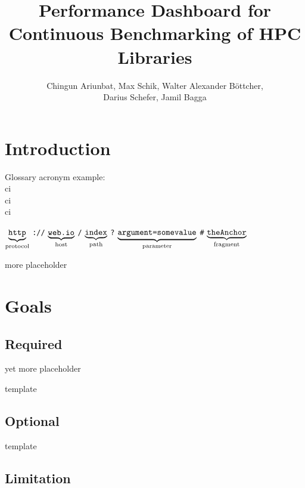 \documentclass[parskip=full,11pt]{scrartcl}
\title{Performance Dashboard for Continuous Benchmarking of HPC Libraries}
\author{Chingun Ariunbat, Max Schik, Walter Alexander B\"ottcher,\\ Darius Schefer, Jamil Bagga}
\newcommand\urlpart[2]{$\underbrace{\text{\texttt{#1}}}_{\text{#2}}$}
\begin{document}
\maketitle

\section{Introduction}
Glossary acronym example: \\
\acrshort{ci} \\
\acrlong{ci} \\
\acrfull{ci}

\begin{center}
\urlpart{http}{protocol}%
\texttt{://}%
\urlpart{web.io}{host}%
\texttt{/}%
\urlpart{index}{path}%
\texttt{?}%
\urlpart{argument=somevalue}{parameter}%
\texttt{\#}%
\urlpart{theAnchor}{fragment}
\end{center}

more placeholder

\pagebreak
\section{Goals}

\subsection{Required}


yet more placeholder




template

\subsection{Optional}



template

\subsection{Limitation}
\end{document}
